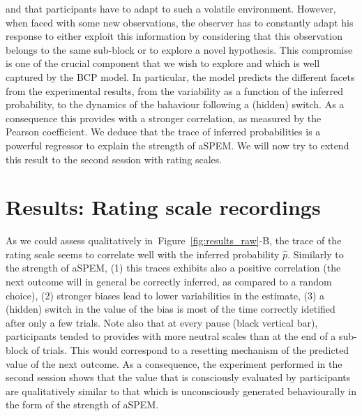 \documentclass[profile,final,english, draft]{article}%
\newcommand{\seeFig}[1]{Figure~\ref{fig:#1}}
\begin{document}
and that participants have to adapt to such a volatile environment.
However, when faced with some new observations,
the observer has to constantly adapt his response
to either exploit this information by considering that
this observation belongs to the same sub-block or to explore
a novel hypothesis.
This compromise is one of the crucial component that we wish to explore
and which is well captured by the BCP model.
In particular, the model predicts the different facets
from the experimental results,
from the variability as a function of the inferred probability,
to the dynamics of the bahaviour following a (hidden) switch.
As a consequence this provides with a stronger correlation,
as measured by the Pearson coefficient.
We deduce that the trace of inferred probabilities is a powerful regressor
to explain the strength of aSPEM.
We will now try to extend this result
to the second session with rating scales.
\section{Results: Rating scale recordings}
\label{sec:rating_scale}
As we could assess qualitatively in~\seeFig{results_raw}-B,
the trace of the rating scale seems to correlate well
with the inferred probability $\hat{p}$.
Similarly to the strength of aSPEM,
(1) this traces exhibits also a positive correlation
(the next outcome will in general be correctly inferred,
as compared to a random choice),
(2) stronger biases lead to lower variabilities in the estimate,
(3) a (hidden) switch in the value of the bias is
most of the time correctly idetified after only a few trials.
Note also that at every pause (black vertical bar),
participants tended to provides with more neutral scales
than at the end of a sub-block of trials.
This would correspond to a resetting mechanism
of the predicted value of the next outcome.
As a consequence, the experiment performed in the second session
shows that the value that is consciously evaluated by participants
are qualitatively similar to that which is unconsciously generated behaviourally
in the form of the strength of aSPEM.
\end{document}
